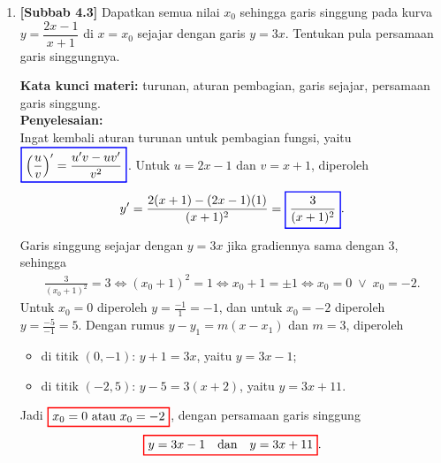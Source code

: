 \documentclass[10pt,openany,a4paper]{article}
\theoremstyle{definition}
\theoremstyle{definition}
\theoremstyle{plain}
\newenvironment{jawab}[2][tes]{%
\par\noindent\textbf{Kata kunci materi:} #1.\\
\textbf{Penyelesaian:} #2%
}{}
\begin{document}
\begin{enumerate}
    \item \textbf{[Subbab 4.3]} Dapatkan semua nilai $x_0$ sehingga garis singgung pada kurva $y=\dfrac{2x-1}{x+1}$ di $x=x_0$ sejajar dengan garis $y=3x$. Tentukan pula persamaan garis singgungnya.
    \begin{jawab}[turunan, aturan pembagian, garis sejajar, persamaan garis singgung]{~\\
        Ingat kembali aturan turunan untuk pembagian fungsi, yaitu $\colorlet{oldcolor}{.}
        \color{blue}
        \setlength{\fboxrule}{1pt} \boxed{\color{oldcolor}\left(\frac{u}{v}\right)' = \frac{u'v - uv'}{v^2}}\color{oldcolor}$. Untuk $u=2x-1$ dan $v=x+1$, diperoleh
        \begin{align*}
            y' = \frac{2(x+1)-(2x-1)(1)}{(x+1)^2} = \colorlet{oldcolor}{.}
        \color{blue}
        \setlength{\fboxrule}{1pt} \boxed{\color{oldcolor}\frac{3}{(x+1)^2}}\color{oldcolor}.
        \end{align*}
        Garis singgung sejajar dengan $y=3x$ jika gradiennya sama dengan $3$, sehingga
        \begin{align*}
            \frac{3}{(x_0+1)^2}=3 \iff (x_0+1)^2=1 \iff x_0+1=\pm 1 \iff x_0=0 \;\vee\; x_0=-2.
        \end{align*}
        Untuk $x_0=0$ diperoleh $y=\frac{-1}{1}=-1$, dan untuk $x_0=-2$ diperoleh $y=\frac{-5}{-1}=5$. Dengan rumus $y - y_1 = m(x - x_1)$ dan $m=3$, diperoleh
        \begin{itemize}
            \item di titik $(0,-1)$: $y+1=3x$, yaitu $y=3x-1$;
            \item di titik $(-2,5)$: $y-5=3(x+2)$, yaitu $y=3x+11$.
        \end{itemize}
        Jadi $\colorlet{oldcolor}{.}
        \color{red}
        \setlength{\fboxrule}{1pt} \boxed{\color{oldcolor}x_0=0 \text{ atau } x_0=-2}\color{oldcolor}$, dengan persamaan garis singgung
        \[\colorlet{oldcolor}{.}
        \color{red}
        \setlength{\fboxrule}{1pt} \boxed{\color{oldcolor}y=3x-1 \quad\text{dan}\quad y=3x+11}\color{oldcolor}.\]
    }
    \end{jawab}

\end{enumerate}

\newpage
\end{document}
